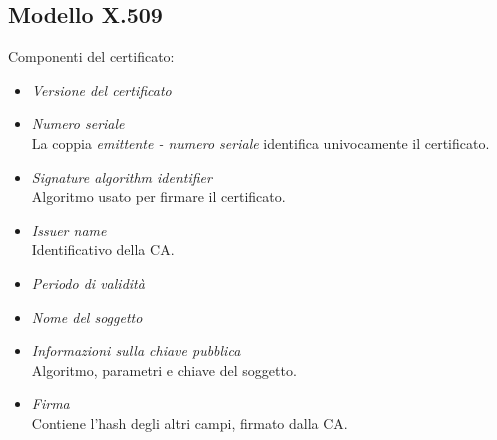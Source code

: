 \documentclass[a4paper, 11pt, notitlepage, fleqn]{report}
\begin{document}
\subsection{Modello X.509}
\begin{minipage}[c]{.52\textwidth}
	Componenti del certificato:
	\begin{itemize}
		\item \emph{Versione del certificato}
		\item \emph{Numero seriale}\\
		La coppia \emph{emittente - numero seriale} identifica univocamente il certificato.
		\item \emph{Signature algorithm identifier}\\
		Algoritmo usato per firmare il certificato.
		\item \emph{Issuer name}\\
		Identificativo della CA.
		\item \emph{Periodo di validità}
		\item \emph{Nome del soggetto}
		\item \emph{Informazioni sulla chiave pubblica}\\
		Algoritmo, parametri e chiave del soggetto.
		\item \emph{Firma}\\
		Contiene l'hash degli altri campi, firmato dalla CA.
	\end{itemize}
\end{minipage}
\hfil
\end{document}
